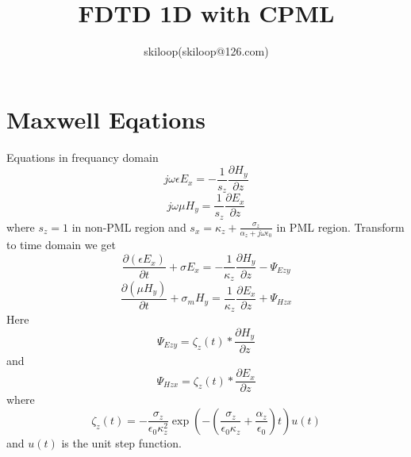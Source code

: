 \documentclass[a4paper,10pt]{article}
\title{FDTD 1D with CPML}
\author{skiloop(skiloop@126.com)}
\begin{document}
\maketitle
\section{Maxwell Eqations}
Equations in frequancy domain
\begin{equation}
j\omega\epsilon E_{x}=-\frac{1}{s_{z}}\frac{\partial H_{y}}{\partial z}
\end{equation}
\begin{equation}
j\omega\mu H_{y}=\frac{1}{s_{z}}\frac{\partial E_{x}}{\partial z}
\end{equation}
where $s_z=1$ in non-PML region and $s_x=\kappa_z+\frac{\sigma_z}{\alpha_z+j\omega\epsilon_0}$ in PML region.
Transform to time domain we get
\begin{equation}
\frac{\partial( \epsilon E_{x})}{\partial t}+\sigma E_{x}=-\frac{1}{\kappa_{z}}\frac{\partial H_{y}}{\partial z}-\Psi_{Ezy}
\end{equation}
\begin{equation}
\frac{\partial( \mu H_{y})}{\partial t}+\sigma_{m} H_{y}=\frac{1}{\kappa_{z}}\frac{\partial E_{x}}{\partial z}+\Psi_{Hzx}
\end{equation}
Here
\begin{equation}
\Psi_{Ezy}=\zeta_{z}(t)*\frac{\partial H_{y}}{\partial z}
\end{equation}
and
\begin{equation}
\Psi_{Hzx}=\zeta_{z}(t)*\frac{\partial E_{x}}{\partial z}
\end{equation}
where
\begin{equation}
\zeta_{z}(t)=-\frac{\sigma_z}{\epsilon_0\kappa^{2}_{z}}\exp\left(-\left(\frac{\sigma_z}{\epsilon_0\kappa_z}+\frac{\alpha_z}{\epsilon_0}\right)t\right)u(t)
\end{equation}
and $u(t)$ is the unit step function.
\end{document}
